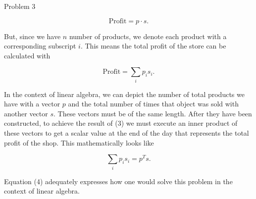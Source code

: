 \begin{problem}{Problem 3}
\begin{highlight}[Solution]
        \begin{equation}
            \text{Profit} = p \cdot s.
        \end{equation}

        But, since we have $n$ number of products, we denote each product with a corresponding subscript $i$. This means the total profit of the store can be calculated with

        \begin{equation}
            \text{Profit} = \sum_{i} p_{i}s_{i}.
        \end{equation}

        In the context of linear algebra, we can depict the number of total products we have with a vector $p$ and the total number of times that object was sold with another vector $s$. These vectors must be of the
        same length. After they have been constructed, to achieve the result of (3) we must execute an inner product of these vectors to get a scalar value at the end of the day that represents the total profit of the
        shop. This mathematically looks like

        \begin{equation}
            \sum_{i} p_{i}s_{i} = p^{T}s.
        \end{equation}

        Equation (4) adequately expresses how one would solve this problem in the context of linear algebra.
    \end{highlight}
\end{problem}

